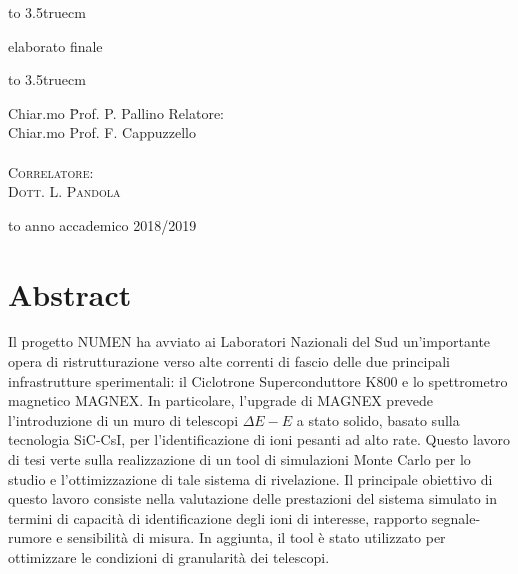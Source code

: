 \documentclass[10pt,foldmark,notumble]{leaflet}
\newcommand{\geant}{Geant4}
\begin{document}
\begin{center}
\centerline{\hbox to 3.5truecm{\hrulefill}}
{\sc elaborato finale}\\
\centerline{\hbox to 3.5truecm{\hrulefill}}

\vfill

\begin{minipage}{\textwidth}
\begin{flushright}
\begin{minipage}{0.3\textwidth}
\begin{tabbing}
Chiar.mo \= Prof. P. Pallino \kill
Relatore: \> \\
Chiar.mo \> Prof. F. Cappuzzello \\
\\
\textsc{Correlatore:} \\
\textsc{Dott. L. Pandola}
\end{tabbing}
\end{minipage}
\end{flushright}
\end{minipage}

\vfill

\hbox to \textwidth{\hrulefill}
{\sc anno accademico 2018/2019}

\end{center}

\newpage

\section{Abstract}

Il progetto NUMEN ha avviato ai Laboratori Nazionali del Sud un'importante opera di ristrutturazione verso alte correnti di fascio delle due principali infrastrutture sperimentali: il Ciclotrone Superconduttore K800 e lo spettrometro magnetico MAGNEX.
In particolare, l'upgrade di MAGNEX prevede l'introduzione di un muro di telescopi $\Delta E - E$ a stato solido, basato sulla tecnologia SiC-CsI, per l'identificazione di ioni pesanti ad alto rate.
Questo lavoro di tesi verte sulla realizzazione di un tool di simulazioni Monte Carlo per lo studio e l'ottimizzazione di tale sistema di rivelazione.
Il principale obiettivo di questo lavoro consiste nella valutazione delle prestazioni del sistema simulato in termini di capacità di identificazione degli ioni di interesse, rapporto segnale-rumore e sensibilità di misura.
In aggiunta, il tool è stato utilizzato per ottimizzare le condizioni di granularità dei telescopi.
\end{document}
